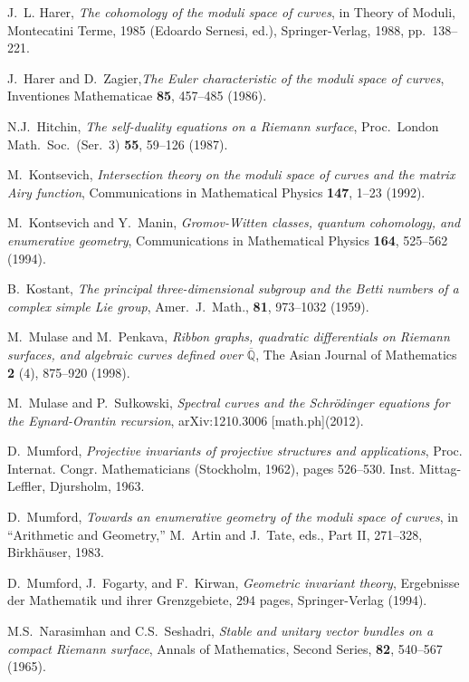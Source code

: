 \documentclass[oneside, 11pt]{amsart}
\theoremstyle{definition}
\numberwithin{equation}{subsection}
\begin{document}
{\begin{thebibliography}{10}
 J.~L. Harer, \emph{The cohomology of the moduli space of curves},
in Theory of Moduli, Montecatini Terme, 1985 (Edoardo Sernesi, ed.), Springer-Verlag,
 1988, pp.~138--221.

 J.~Harer and D.~Zagier,\emph{The Euler characteristic of the moduli space of curves}, Inventiones Mathematicae \textbf{85}, 457--485 (1986).

 N.J.~Hitchin, \emph{The self-duality equations on a Riemann surface}, Proc.\ London Math.\ Soc.\ (Ser.\ 3) \textbf{55}, 59--126  (1987).


M.~Kontsevich, \emph{Intersection theory on the moduli space of curves and the
matrix {Airy} function}, Communications in Mathematical Physics \textbf{147}, 1--23  (1992).

 M.~Kontsevich and Y.~Manin, \emph{Gromov-Witten classes, quantum 
cohomology, and enumerative geometry}, Communications in Mathematical Physics \textbf{164}, 525--562 (1994).




 B.~Kostant,
 \emph{The principal three-dimensional subgroup and the Betti numbers of a complex simple Lie group},
 Amer.\ J.\ Math., \textbf{81}, 973--1032 (1959).


  M.~Mulase and M.~Penkava, \emph{Ribbon graphs, quadratic differentials on Riemann surfaces, and algebraic curves defined over $\overline{\mathbb{Q}}$}, The Asian Journal of Mathematics  \textbf{2} (4), 875--920 (1998).

 M.~Mulase and P.~Su\l kowski, \emph{Spectral curves and the Schr\"odinger equations for the Eynard-Orantin recursion}, arXiv:1210.3006 [math.ph](2012).




 D.~Mumford, \emph{Projective invariants of projective structures and applications}, Proc. Internat. Congr. Mathematicians (Stockholm, 1962), pages 526–530. Inst. Mittag-Leffler, Djursholm, 1963.

 D.~Mumford, \emph{Towards an enumerative geometry of the moduli space of curves}, in ``Arithmetic and Geometry,'' M.~Artin and J.~Tate, eds., Part II, 271--328, Birkh\"auser, 1983.

D.~Mumford, J.~Fogarty, and F.~Kirwan,
\emph{Geometric invariant theory},
Ergebnisse der Mathematik und ihrer Grenzgebiete, 294 pages,
Springer-Verlag (1994).


M.S.~Narasimhan and C.S.~Seshadri, 
\emph{Stable and unitary vector bundles on a compact Riemann surface}, Annals of Mathematics, Second Series, \textbf{82}, 540--567 (1965).




\end{thebibliography}}
\end{document}
